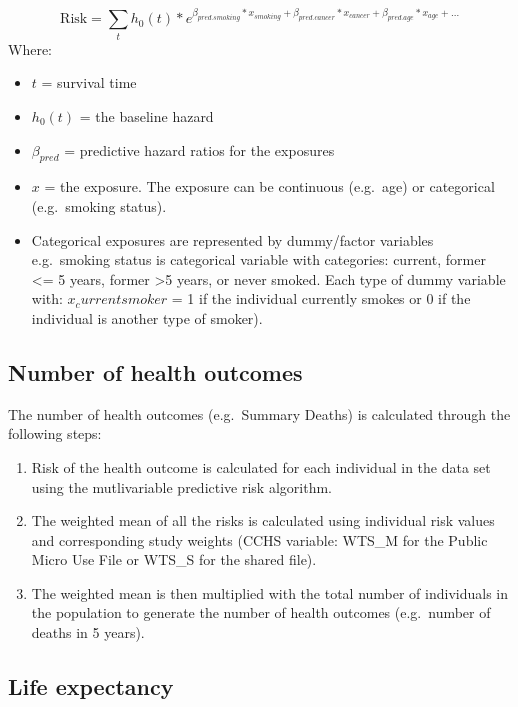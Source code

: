 \documentclass[]{book}
\providecommand{\tightlist}{%
  \setlength{\itemsep}{0pt}\setlength{\parskip}{0pt}}
\begin{document}
\[ \text{Risk} = \sum_t h_0(t) * e^{\beta_{pred.smoking}*x_{smoking}+\beta_{pred.cancer}*x_{cancer} + \beta_{pred.age}*x_{age} +...}  \]
Where:

\begin{itemize}
\item
  \(t\) = survival time
\item
  \(h_0(t)\) = the baseline hazard
\item
  \(\beta_{pred}\) = predictive hazard ratios for the exposures
\item
  \(x\) = the exposure. The exposure can be continuous (e.g.~age) or
  categorical (e.g.~smoking status).
\item
  Categorical exposures are represented by dummy/factor variables
  e.g.~smoking status is categorical variable with categories: current,
  former \textless{}= 5 years, former \textgreater{}5 years, or never
  smoked. Each type of dummy variable with: \(x_current smoker\) = 1 if
  the individual currently smokes or 0 if the individual is another type
  of smoker).
\end{itemize}

\subsection{Number of health outcomes}\label{number-of-health-outcomes}

The number of health outcomes (e.g.~Summary Deaths) is calculated
through the following steps:

\begin{enumerate}
\def\labelenumi{\arabic{enumi}.}
\tightlist
\item
  Risk of the health outcome is calculated for each individual in the
  data set using the mutlivariable predictive risk algorithm.
\item
  The weighted mean of all the risks is calculated using individual risk
  values and corresponding study weights (CCHS variable: WTS\_M for the
  Public Micro Use File or WTS\_S for the shared file).
\item
  The weighted mean is then multiplied with the total number of
  individuals in the population to generate the number of health
  outcomes (e.g.~number of deaths in 5 years).
\end{enumerate}

\subsection{Life expectancy}\label{life-expectancy}
\end{document}
